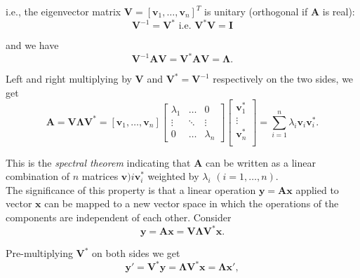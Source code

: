 \documentclass[10pt,b5paper,titlepage]{book}
\begin{document}
\begin{itemize}
i.e., the eigenvector matrix $\mathbf{V} = [\mathbf{v}_{1}, \dots, \mathbf{v}_{n}]^{T}$ is unitary (orthogonal if $\mathbf{A}$ is real):
\begin{equation}
\mathbf{V}^{-1} = \mathbf{V}^{*}
\text{ i.e. }
\mathbf{V}^{*}\mathbf{V} = \mathbf{I}
\end{equation}

and we have
\begin{equation}
\mathbf{V}^{-1} \mathbf{A} \mathbf{V} = \mathbf{V}^{*} \mathbf{A} \mathbf{V} = \mathbf{\Lambda}
.\end{equation}

Left and right multiplying by $\mathbf{V}$ and $\mathbf{V}^{*} = \mathbf{V}^{-1}$ respectively on the two sides, we get
\begin{equation}
\mathbf{A} = \mathbf{V} \mathbf{\Lambda} \mathbf{V}^{*} =
[\mathbf{v}_{1}, \dots, \mathbf{v}_{n}] \begin{bmatrix}
\lambda_{1} & \dots & 0\\
\vdots & \ddots & \vdots\\
0 & \dots & \lambda_{n}
\end{bmatrix} \begin{bmatrix}
\mathbf{v}_{1}^{*}\\
\vdots\\
\mathbf{v}_{n}^{*}\\
\end{bmatrix} =
\sum_{i=1}^{n}{\lambda_{i} \mathbf{v}_{i} \mathbf{v}_{i}^{*}}
.\end{equation}

This is the \textit{spectral theorem} indicating that $\mathbf{A}$ can be written as a linear combination of $n$ matrices $\mathbf{v}){i} \mathbf{v}_{i}^{*}$ weighted by $\lambda_{i}$ $(i = 1,\dots, n)$.\\

The significance of this property is that a linear operation $\mathbf{y} = \mathbf{A} \mathbf{x}$ applied to vector $\mathbf{x}$ can be mapped to a new vector space in which the operations of the components are independent of each other. Consider
\begin{equation}
\mathbf{y} = \mathbf{A} \mathbf{x} = \mathbf{V} \mathbf{\Lambda} \mathbf{V}^{*} \mathbf{x}
.\end{equation}

Pre-multiplying $\mathbf{V}^{*}$ on both sides we get
\begin{equation}
\mathbf{y}' = \mathbf{V}^{*} \mathbf{y} = \mathbf{\Lambda} \mathbf{V}^{*} \mathbf{x} = \mathbf{\Lambda} \mathbf{x}'
,\end{equation}


\end{itemize}
\end{document}
